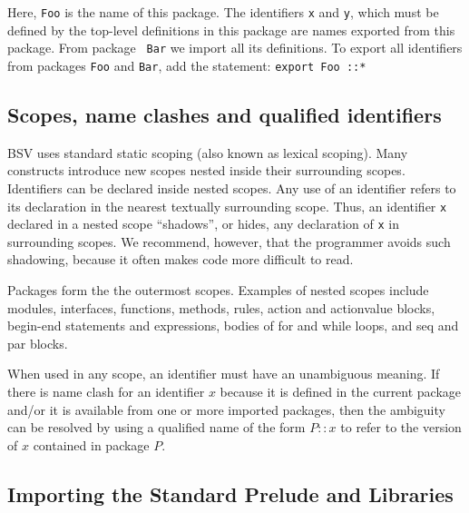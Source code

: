 \documentclass[twoside,letterpaper]{article}
\newcommand{\BSV}{BSV}
\newcommand{\te}[1]{\texttt{#1}}
\begin{document}
Here, \texttt{Foo} is the name of this package. The identifiers \texttt{x}
and \texttt{y}, which must be defined by the top-level definitions in
this package are names exported from this package.  From package {\tt
Bar} we import all its definitions.    To export all identifiers from
 packages \te{Foo} and \te{Bar}, add the statement: \te{export Foo ::*}


\subsection{Scopes, name clashes and qualified identifiers}

\label{sec-scopes}

{\BSV} uses standard static scoping (also known as lexical scoping).
Many constructs introduce new scopes nested inside their surrounding
scopes.  Identifiers can be declared inside nested scopes.  Any use of
an identifier refers to its declaration in the nearest textually
surrounding scope.  Thus, an identifier \texttt{x} declared in a nested
scope ``shadows'', or hides, any declaration of \texttt{x} in surrounding
scopes.  We recommend, however, that the programmer avoids such
shadowing, because it often makes code more difficult to read.

Packages form the the outermost scopes.  Examples of nested scopes
include modules, interfaces, functions, methods, rules, action and
actionvalue blocks, begin-end statements and expressions, bodies of
for and while loops, and seq and par blocks.

When used in any scope, an identifier must have an unambiguous
meaning.  If there is name clash for an identifier $x$ because it is
defined in the current package and/or it is available from one or more
imported packages, then the ambiguity can be resolved by using a
qualified name of the form $P::x$ to refer to the version of $x$
contained in package $P$.


\subsection{Importing the Standard Prelude and Libraries}
\end{document}
